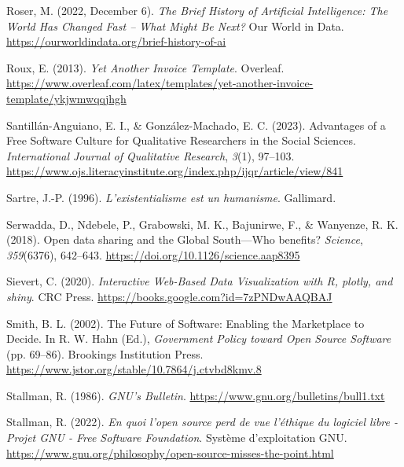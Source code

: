 \documentclass[
  letterpaper,
  DIV=11,
  numbers=noendperiod]{scrreprt}
\newlength{\cslhangindent}
\newlength{\cslentryspacingunit} %
\newenvironment{CSLReferences}[2] %
 {%
  \setlength{\parindent}{0pt}
  \ifodd #1
  \let\oldpar\par
  \def\par{\hangindent=\cslhangindent\oldpar}
  \fi
  \setlength{\parskip}{#2\cslentryspacingunit}
 }%
 {}
\begin{document}
\begin{CSLReferences}{1}{0}
\leavevmode{}%
Roser, M. (2022, December 6). \emph{The {Brief History} of {Artificial
Intelligence}: {The World Has Changed Fast} -- {What Might Be Next}?}
Our World in Data. \url{https://ourworldindata.org/brief-history-of-ai}

\leavevmode{}%
Roux, E. (2013). \emph{Yet {Another Invoice Template}}. Overleaf.
\url{https://www.overleaf.com/latex/templates/yet-another-invoice-template/ykjwmwqqjhgh}

\leavevmode{}%
Santillán-Anguiano, E. I., \& González-Machado, E. C. (2023). Advantages
of a {Free Software Culture} for {Qualitative Researchers} in the
{Social Sciences}. \emph{International Journal of Qualitative Research},
\emph{3}(1), 97--103.
\url{https://www.ojs.literacyinstitute.org/index.php/ijqr/article/view/841}

\leavevmode{}%
Sartre, J.-P. (1996). \emph{L'existentialisme est un humanisme}.
Gallimard.

\leavevmode{}%
Serwadda, D., Ndebele, P., Grabowski, M. K., Bajunirwe, F., \& Wanyenze,
R. K. (2018). Open data sharing and the {Global South}---{Who} benefits?
\emph{Science}, \emph{359}(6376), 642--643.
\url{https://doi.org/10.1126/science.aap8395}

\leavevmode{}%
Sievert, C. (2020). \emph{Interactive {Web-Based Data Visualization}
with {R}, plotly, and shiny}. CRC Press.
\url{https://books.google.com?id=7zPNDwAAQBAJ}

\leavevmode{}%
Smith, B. L. (2002). The {Future} of {Software}: {Enabling} the
{Marketplace} to {Decide}. In R. W. Hahn (Ed.), \emph{Government
{Policy} toward {Open Source Software}} (pp. 69--86). Brookings
Institution Press.
\url{https://www.jstor.org/stable/10.7864/j.ctvbd8kmv.8}

\leavevmode{}%
Stallman, R. (1986). \emph{{GNU}'s {Bulletin}}.
\url{https://www.gnu.org/bulletins/bull1.txt}

\leavevmode{}%
Stallman, R. (2022). \emph{En quoi l'open source perd de vue l'éthique
du logiciel libre - {Projet GNU} - {Free Software Foundation}}. Système
d'exploitation GNU.
\url{https://www.gnu.org/philosophy/open-source-misses-the-point.html}


\end{CSLReferences}
\end{document}
